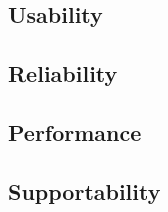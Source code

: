 \documentclass[fontsize=12pt,
               paper=a4,
               twoside=false,
               parskip=half,
               ]{scrartcl}
\begin{document}
\newcommand{\doctitle}{Supplementary Specification}
\newcommand{\docrevision}{45}


\tableofcontents



\subsection{Usability}


\subsection{Reliability}


\subsection{Performance}


\subsection{Supportability}

\end{document}
